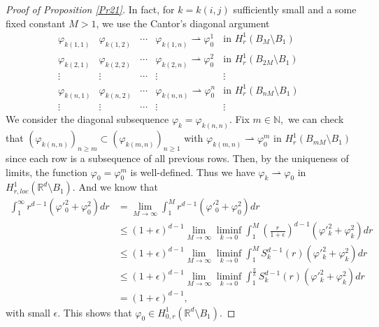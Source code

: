 \documentclass[reqno]{amsart}
\numberwithin{equation}{section}
\newenvironment{key words}{\textbf{Keywords}\mbox{  }}{ }
\begin{document}
\begin{proof}[Proof of Proposition \ref{Pr21}]
In fact, for $k = k(i,j)$ sufficiently small and a some fixed constant $M>1$, we use the Cantor's diagonal argument
\begin{equation*}
  \begin{matrix}
  \varphi_{k(1,1)}&\varphi_{k(1,2)}&\cdots&\varphi_{k(1,n)}\rightharpoonup\varphi_{0}^1 &\mbox{in $H^1_r(B_{M}\setminus B_{1})$ }\\
  \varphi_{k(2,1)}&\varphi_{k(2,2)}&\cdots&\varphi_{k(2,n)}\rightharpoonup\varphi_{0}^2 &\mbox{in $H^1_r(B_{2M}\setminus B_{1})$ }\\
  \vdots&\vdots&\cdots&\vdots&\vdots\\
  \varphi_{k(n,1)}&\varphi_{k(n,2)}&\cdots&\varphi_{k(n,n)}\rightharpoonup\varphi_{0}^n &\mbox{in $H^1_r(B_{nM}\setminus B_{1})$ }\\
   \vdots&\vdots&\cdots&\vdots&\vdots
  \end{matrix}
\end{equation*}
We consider the diagonal subsequence $\varphi_{k}=\varphi_{k(n,n)}$. Fix $m\in\mathbb{N},$ we can check that $(\varphi_{k(n,n)})_{n\geq m}\subset(\varphi_{k(m,n)})_{n\geq1}$ with $\varphi_{k(m,n)}\rightharpoonup\varphi_{0}^m$ in $H^1_r(B_{mM}\setminus B_{1})$ since each row is a subsequence of all previous rows. Then, by the uniqueness of limits, the function $\varphi_{0}=\varphi_{0}^m$ is well-defined. Thus we have $\varphi_{k}\rightharpoonup\varphi_{0}$ in $H_{r,loc}^{1}(\mathbb{R}^{d}\setminus B_{1}).$ And we know that
\begin{align*}
  \int_{1}^{\infty}r^{d-1}(\varphi'^{2}_{0}+\varphi^{2}_{0})dr&=\mathop {\lim}\limits_{M\rightarrow \infty}\int_{1}^{M}r^{d-1}(\varphi'^{2}_{0}+\varphi^{2}_{0})dr\\
     &\leq(1+\epsilon)^{d-1}\mathop {\lim}\limits_{M\rightarrow \infty}\mathop {\liminf}\limits_{k\rightarrow 0}\int_{1}^{M}\left(\frac{r}{1+\epsilon}\right)^{d-1}(\varphi'^{2}_{k}+\varphi^{2}_{k})dr\\
     &\leq(1+\epsilon)^{d-1}\mathop {\lim}\limits_{M\rightarrow \infty}\mathop {\liminf}\limits_{k\rightarrow 0}\int_{1}^{M}S^{d-1}_{k}(r)(\varphi'^{2}_{k}+\varphi^{2}_{k})dr\\
     &\leq(1+\epsilon)^{d-1}\mathop {\lim}\limits_{M\rightarrow \infty}\mathop {\liminf}\limits_{k\rightarrow 0}\int_{1}^{\frac{\pi}{k}}S^{d-1}_{k}(r)(\varphi'^{2}_{k}+\varphi^{2}_{k})dr\\
     &=(1+\epsilon)^{d-1},
\end{align*}
with small $\epsilon.$ This shows that $\varphi_{0}\in H_{0,r}^{1}(\mathbb{R}^{d}\setminus B_{1}).$


\end{proof}
\end{document}

